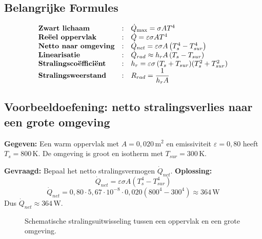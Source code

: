 \documentclass[a4paper,11pt,twoside]{report}
\begin{document}
\subsection*{Belangrijke Formules}
\begingroup
\setlength{\tabcolsep}{6pt}
\renewcommand{\arraystretch}{1.35}
\[
\begin{array}{@{}lcl@{}}
            \text{\textbf{Zwart lichaam}} &:& \dot{Q}_{\max}=\sigma A T^4\\
            \text{\textbf{Reëel oppervlak}} &:& \dot{Q}=\varepsilon\sigma A T^4\\
            \text{\textbf{Netto naar omgeving}} &:& \dot{Q}_{net}=\varepsilon\sigma A\left(T_s^4-T_{sur}^4\right)\\
            \text{\textbf{Linearisatie}} &:& \dot{Q}_{rad}\approx h_r A\,(T_s-T_{sur})\\
            \text{\textbf{Stralingscoëfficiënt}} &:& h_r=\varepsilon\sigma\,(T_s+T_{sur})(T_s^2+T_{sur}^2)\\
            \text{\textbf{Stralingsweerstand}} &:& R_{rad}=\dfrac{1}{h_r A}\\
\end{array}
\]
\endgroup
    
\subsection*{Voorbeeldoefening: netto stralingsverlies naar een grote omgeving}
                \textbf{Gegeven:} Een warm oppervlak met $A=0{,}020\,\mathrm{m^2}$ en emissiviteit $\varepsilon=0{,}80$ heeft $T_s=800\,\mathrm{K}$. De omgeving is groot en isotherm met $T_{sur}=300\,\mathrm{K}$.

                        \textbf{Gevraagd:} Bepaal het netto stralingsvermogen $\dot{Q}_{net}$.
                        \textbf{Oplossing:}
\[
\dot{Q}_{net}=\varepsilon\sigma A\left(T_s^4-T_{sur}^4\right)
\]
\[\dot{Q}_{net}=0{,}80\cdot 5{,}67\cdot 10^{-8}\cdot 0{,}020\left(800^4-300^4\right)\approx 364\,\mathrm{W}
\]
Dus $\boxed{\dot{Q}_{net}\approx 364\,\mathrm{W}}$.

\begin{figure}[H]
    \centering
    \caption{Schematische stralingsuitwisseling tussen een oppervlak en een grote omgeving.}
\end{figure}
\end{document}
